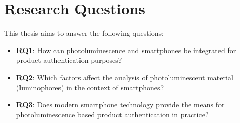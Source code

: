 \documentclass[thesis.tex]{subfiles}
\begin{document}
\section{Research Questions}
\label{chapter:research-questions}

This thesis aims to answer the following questions:

\begin{itemize}
  \item \label{RQ1} \textbf{RQ1}: How can photoluminescence and smartphones be integrated for product authentication purposes?
  \item \label{RQ2} \textbf{RQ2}: Which factors affect the analysis of photoluminescent material (luminophores) in the context of smartphones?
  \item \label{RQ3} \textbf{RQ3}: Does modern smartphone technology provide the means for photoluminescence based product authentication in practice?
\end{itemize}
\end{document}
